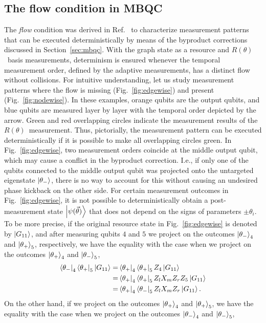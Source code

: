 \documentclass[../main.tex]{subfiles}
\begin{document}
\subsection{The flow condition in MBQC}
The \textit{flow} condition was derived in Ref.~\cite{danos2006determinism} to characterize measurement patterns that can be executed deterministically by means of the byproduct corrections discussed in Section~\ref{sec:mbqc}. With the graph state as a resource and $R(\theta)$~basis measurements, determinism is ensured whenever the temporal measurement order, defined by the adaptive measurements, has a distinct flow without collisions. For intuitive understanding, let us study measurement patterns where the flow is missing (Fig.~\ref{fig:edgewise}) and present (Fig.~\ref{fig:nodewise}). In these examples, orange qubits are the output qubits, and blue qubits are measured layer by layer with the temporal order depicted by the arrow. Green and red overlapping circles indicate the measurement results of the $R(\theta)$~measurement. Thus, pictorially, the measurement pattern can be executed deterministically if it is possible to make all overlapping circles green. In Fig.~\ref{fig:edgewise}, two measurement orders coincide at the middle output qubit, which may cause a conflict in the byproduct correction. I.e., if only one of the qubits connected to the middle output qubit was projected onto the untargeted eigenstate $\ket{\theta_-}$, there is no way to account for this without causing an undesired phase kickback on the other side. For certain measurement outcomes in Fig.~\ref{fig:edgewise}, it is not possible to deterministically obtain a post-measurement state $\ket{\psi(\vec{\theta})}$ that does not depend on the signs of parameters $\pm \theta_i$. To be more precise, if the original resource state in Fig.~\ref{fig:edgewise} is denoted by $\ket{G_{11}}$, and after measuring qubits $4$ and $5$ we project on the outcomes $\ket{\theta_-}_4$ and $\ket{\theta_+}_5$, respectively, we have the equality with the case when we project on the outcomes $\ket{\theta_+}_4$ and $\ket{\theta_-}_5$,
\begin{align}\label{eq:pmoutcome}
    \bra{\theta_-}_4 \bra{\theta_+}_5 \ket{G_{11}} =&\bra{\theta_+}_4 \bra{\theta_+}_5 Z_4\ket{G_{11}} \\
=&\bra{\theta_+}_4 \bra{\theta_+}_5  Z_l X_m Z_r Z_5 \ket{G_{11}} \\
=& \bra{\theta_+}_4 \bra{\theta_-}_5  Z_l X_m Z_r  \ket{G_{11}}.
\end{align}
On the other hand, if we project on the outcomes $\ket{\theta_+}_4$ and $\ket{\theta_+}_5$, we have the equality with the case when we project on the outcomes $\ket{\theta_-}_4$ and $\ket{\theta_-}_5$,
\end{document}
